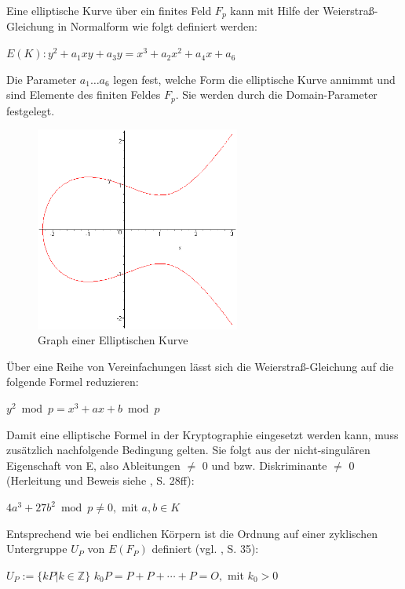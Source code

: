 Eine elliptische Kurve über ein finites Feld $F_p$ kann mit Hilfe der Weierstraß-Gleichung in Normalform wie folgt definiert werden:

\begin{center}
$E(K): y^2 + a_1 x y + a_3 y = x^3 + a_2 x^2 + a_4 x + a_6 $
\end{center}

Die Parameter $a_1 \dots a_6$ legen fest, welche Form die elliptische Kurve annimmt und sind Elemente des finiten Feldes $F_p$. Sie werden durch die Domain-Parameter festgelegt. 

\begin{figure}[H]
	\centering
   \includegraphics[width=0.60\textwidth]{bilder/ellkurve}
	\caption{Graph einer Elliptischen Kurve}
	\label{fig:ellkurve}
\end{figure}

Über eine Reihe von Vereinfachungen lässt sich die Weierstraß-Gleichung auf die folgende Formel reduzieren:  %
\begin{center}
$ y^2 \bmod p = x^3 + a x + b \bmod p $
\end{center}


Damit eine elliptische Formel in der Kryptographie eingesetzt werden kann, muss zusätzlich nachfolgende Bedingung gelten. Sie folgt aus der nicht-singulären Eigenschaft von E, also Ableitungen $\ne$ 0 und bzw. Diskriminante $\ne$ 0 (Herleitung und Beweis siehe \cite{grebe}, S. 28ff):
\begin{center}
$ 4 a^3 + 27 b^2 \bmod p \ne 0, $ mit $ a,b \in K $
\end{center}

Entsprechend wie bei endlichen Körpern ist die Ordnung auf einer zyklischen Untergruppe $U_P$ von $E(F_P)$ definiert (vgl. \cite{grebe}, S. 35):
\begin{center}
$ U_P := \{ k P | k \in \mathbb{Z} \}$
$k_0 P = P + P + \cdots + P = O, $ mit $ k_0 > 0$
\end{center}


